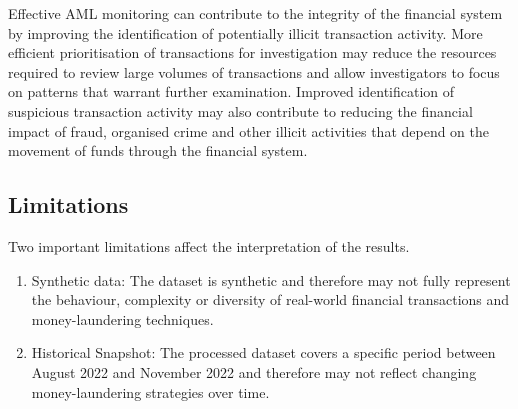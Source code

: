 Effective AML monitoring can contribute to the integrity of the financial system by
improving the identification of potentially illicit transaction activity. More efficient
prioritisation of transactions for investigation may reduce the resources required to
review large volumes of transactions and allow investigators to focus on patterns that
warrant further examination. Improved identification of suspicious transaction activity
may also contribute to reducing the financial impact of fraud, organised crime and other
illicit activities that depend on the movement of funds through the financial system.

\subsection{Limitations}

Two important limitations affect the interpretation of the results.

\begin{enumerate}
    \item Synthetic data: The dataset is synthetic and therefore may not fully represent the behaviour, complexity or diversity of real-world financial transactions and money-laundering techniques.
    \item Historical Snapshot: The processed dataset covers a specific period between August 2022 and November 2022 and therefore may not reflect changing money-laundering strategies over time.
\end{enumerate}